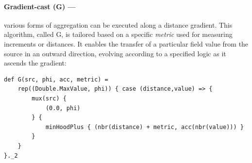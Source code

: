 \paragraph*{Gradient-cast (G) --- }
various forms of aggregation 
 can be executed along a distance gradient.
 This algorithm, called G, is tailored based on a specific \emph{metric} used for measuring increments or distances. 
 It enables the transfer of a particular field value from the source in an outward direction, 
 evolving according to a specified logic as it ascends the gradient:
\begin{lstlisting}
def G(src, phi, acc, metric) =
    rep((Double.MaxValue, phi)) { case (distance,value) => {
        mux(src) {
            (0.0, phi)
        } {
            minHoodPlus { (nbr(distance) + metric, acc(nbr(value))) }
        }
    }
}._2
\end{lstlisting}
